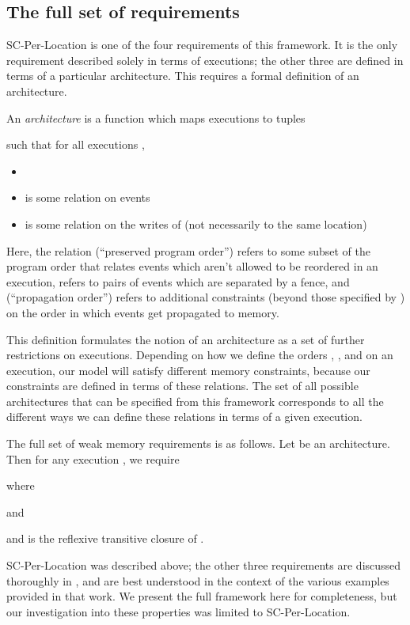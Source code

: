 \documentclass[]{eptcs}
\newenvironment{definition}[1][Definition.]{\begin{trivlist}
\item[\hskip \labelsep {\bfseries #1}]}{\end{trivlist}}
\begin{document}
\subsection{The full set of requirements}

SC-Per-Location is one of the four requirements of this framework. It is the only requirement described solely in terms of executions; the other three are defined in terms of a particular architecture. This requires a formal definition of an architecture.

\begin{definition}
An \emph{architecture} is a function  which maps executions  to tuples 
 
such that for all executions ,
\begin{itemize}
  \item 
  \item  is some relation on events
  \item  is some relation on the writes of  (not necessarily to the same location)
\end{itemize}
\end{definition}
Here, the relation  (``preserved program order'') refers to some subset of the program order that relates events which aren't allowed to be reordered in an execution,  refers to pairs of events which are separated by a fence, and  (``propagation order'') refers to additional constraints (beyond those specified by ) on the order in which events get propagated to memory.

This definition formulates the notion of an architecture as a set of further restrictions on executions. Depending on how we define the orders , , and  on an execution, our model will satisfy different memory constraints, because our constraints are defined in terms of these relations. The set of all possible architectures that can be specified from this framework corresponds to all the different ways we can define these relations in terms of a given execution.

The full set of weak memory requirements is as follows. Let  be an architecture. Then for any execution , we require

where 
 
 
and 
 
and  is the reflexive transitive closure of .

SC-Per-Location was described above; the other three requirements are discussed thoroughly in \cite{alglave_cats}, and are best understood in the context of the various examples provided in that work. We present the full framework here for completeness, but our investigation into these properties was limited to SC-Per-Location.
\end{document}
